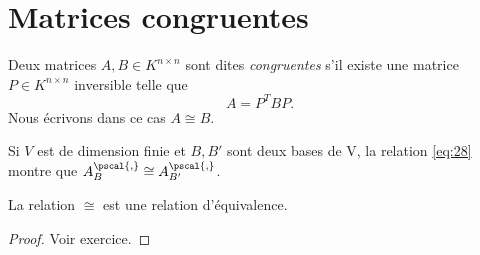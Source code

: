 \section{Matrices congruentes} 
\label{sec:class-des-matr}



\begin{definition}
  \label{def:13}
  Deux matrices $A,B \in K^{n\times n}$ sont dites \emph{congruentes} s'il existe une matrice $P \in K^{n \times n}$ inversible telle que 
\begin{displaymath}
  A = P^T B P.
\end{displaymath}
Nous écrivons dans ce cas $A \cong B$. 
\end{definition}


\begin{example}
  \label{exe:22}
  Si $V$ est de dimension finie et $B,B'$ sont deux bases de V, la relation \eqref{eq:28} montre que $A_B^{\pscal{,}} \cong A_{B'}^{\pscal{,}}$. 
\end{example}

\begin{lemma}
  \label{lem:6}
  La relation $\cong$ est une relation d'équivalence. 
\end{lemma}

\begin{proof}
  Voir exercice. 
\end{proof}


